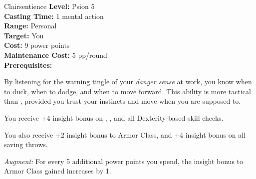 {Clairsentience}
{
	\textbf{Level:}
	Psion 5\\
	\textbf{Casting Time:}
	1 mental action\\
	\textbf{Range:}
	Personal\\
	\textbf{Target:}
	You\\
	\textbf{Cost:}
	9 power points\\
	\textbf{Maintenance Cost:}
	5 pp/round\\
	\textbf{Prerequisites:}
	\\
}
{
	By listening for the warning tingle of your \emph{danger sense} at work, you know when to duck, when to dodge, and when to move forward. This ability is more tactical than , provided you trust your instincts and move when you are supposed to.

	You receive +4 insight bonus on , , and all Dexterity-based skill checks.

	You also receive +2 insight bonus to Armor Class, and +4 insight bonus on all saving throws.

	\textit{Augment:} For every 5 additional power points you spend, the insight bonus to Armor Class gained increases by 1.
}